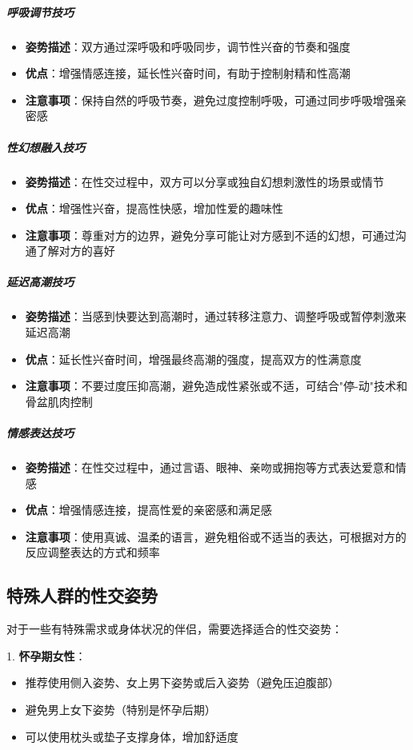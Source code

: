 \documentclass[12pt,UTF8]{ctexbook}
\begin{document}
\subparagraph{呼吸调节技巧}
\begin{itemize}
\item \textbf{姿势描述}：双方通过深呼吸和呼吸同步，调节性兴奋的节奏和强度
\item \textbf{优点}：增强情感连接，延长性兴奋时间，有助于控制射精和性高潮
\item \textbf{注意事项}：保持自然的呼吸节奏，避免过度控制呼吸，可通过同步呼吸增强亲密感
\end{itemize}

\subparagraph{性幻想融入技巧}
\begin{itemize}
\item \textbf{姿势描述}：在性交过程中，双方可以分享或独自幻想刺激性的场景或情节
\item \textbf{优点}：增强性兴奋，提高性快感，增加性爱的趣味性
\item \textbf{注意事项}：尊重对方的边界，避免分享可能让对方感到不适的幻想，可通过沟通了解对方的喜好
\end{itemize}

\subparagraph{延迟高潮技巧}
\begin{itemize}
\item \textbf{姿势描述}：当感到快要达到高潮时，通过转移注意力、调整呼吸或暂停刺激来延迟高潮
\item \textbf{优点}：延长性兴奋时间，增强最终高潮的强度，提高双方的性满意度
\item \textbf{注意事项}：不要过度压抑高潮，避免造成性紧张或不适，可结合"停-动"技术和骨盆肌肉控制
\end{itemize}

\subparagraph{情感表达技巧}
\begin{itemize}
\item \textbf{姿势描述}：在性交过程中，通过言语、眼神、亲吻或拥抱等方式表达爱意和情感
\item \textbf{优点}：增强情感连接，提高性爱的亲密感和满足感
\item \textbf{注意事项}：使用真诚、温柔的语言，避免粗俗或不适当的表达，可根据对方的反应调整表达的方式和频率
\end{itemize}

\subsection{特殊人群的性交姿势}

对于一些有特殊需求或身体状况的伴侣，需要选择适合的性交姿势：

1. \textbf{怀孕期女性}：
  \begin{itemize}
  \item 推荐使用侧入姿势、女上男下姿势或后入姿势（避免压迫腹部）
  \item 避免男上女下姿势（特别是怀孕后期）
  \item 可以使用枕头或垫子支撑身体，增加舒适度
  \end{itemize}
\end{document}
